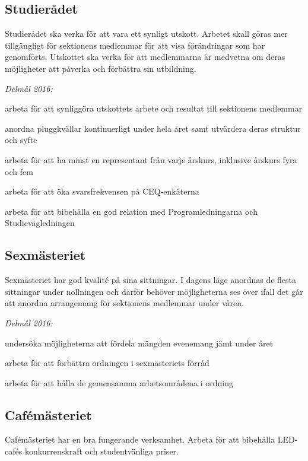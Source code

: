 \documentclass[../_main/handlingar.tex]{subfiles}
\begin{document}
\subsection*{Studierådet}
Studierådet ska verka för att vara ett synligt utskott. Arbetet skall göras mer tillgängligt för sektionens medlemmar för att visa förändringar som har genomförts. Utskottet ska verka för att medlemmarna är medvetna om deras möjligheter att påverka och förbättra sin utbildning.

\emph{Delmål 2016:}
\begin{dashlist}
    \item arbeta för att synliggöra utskottets arbete och resultat till sektionens medlemmar
    \item anordna pluggkvällar kontinuerligt under hela året samt utvärdera deras struktur och syfte
    \item arbeta för att ha minst en representant från varje årskurs, inklusive årskurs fyra och fem
    \item arbeta för att öka svarsfrekvensen på CEQ-enkäterna
    \item arbeta för att bibehålla en god relation med Programledningarna och Studievägledningen
\end{dashlist}

\subsection*{Sexmästeriet}
Sexmästeriet har god kvalité på sina sittningar. I dagens läge anordnas de flesta sittningar under nollningen och därför behöver möjligheterna ses över ifall det går att anordna arrangemang för sektionens medlemmar under våren.

\emph{Delmål 2016:}
\begin{dashlist}
    \item undersöka möjligheterna att fördela mängden evenemang jämt under året
    \item arbeta för att förbättra ordningen i sexmästeriets förråd
    \item arbeta för att hålla de gemensamma arbetsområdena i ordning
\end{dashlist}

\subsection*{Cafémästeriet}
Cafémästeriet har en bra fungerande verksamhet. Arbeta för att bibehålla LED-cafés konkurrenskraft och studentvänliga priser.
\end{document}

